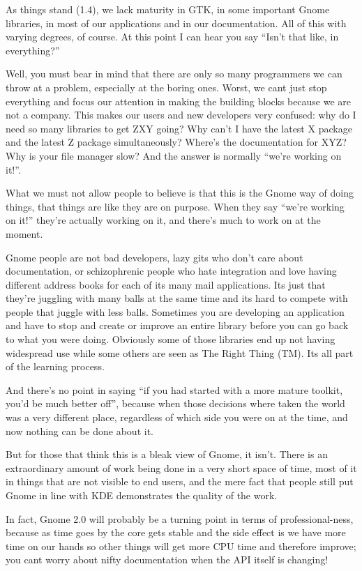 \documentclass{memoir}
\begin{document}
As things stand (1.4), we lack maturity in GTK, in some important
Gnome libraries, in most of our applications and in our
documentation. All of this with varying degrees, of course. At this
point I can hear you say ``Isn't that like, in everything?''

Well, you must bear in mind that there are only so many programmers we
can throw at a problem, especially at the boring ones. Worst, we cant
just stop everything and focus our attention in making the building
blocks because we are not a company. This makes our users and new
developers very confused: why do I need so many libraries to get ZXY
going? Why can't I have the latest X package and the latest Z package
simultaneously? Where's the documentation for XYZ? Why is your file
manager slow? And the answer is normally ``we're working on it!''.

What we must not allow people to believe is that this is the Gnome way
of doing things, that things are like they are on purpose. When they
say ``we're working on it!'' they're actually working on it, and
there's much to work on at the moment.

Gnome people are not bad developers, lazy gits who don't care about
documentation, or schizophrenic people who hate integration and love
having different address books for each of its many mail
applications. Its just that they're juggling with many balls at the
same time and its hard to compete with people that juggle with less
balls. Sometimes you are developing an application and have to stop
and create or improve an entire library before you can go back to what
you were doing. Obviously some of those libraries end up not having
widespread use while some others are seen as The Right Thing (TM). Its
all part of the learning process.

And there's no point in saying ``if you had started with a more mature
toolkit, you'd be much better off'', because when those decisions
where taken the world was a very different place, regardless of which
side you were on at the time, and now nothing can be done about it.

But for those that think this is a bleak view of Gnome, it
isn't. There is an extraordinary amount of work being done in a very
short space of time, most of it in things that are not visible to end
users, and the mere fact that people still put Gnome in line with KDE
demonstrates the quality of the work.

In fact, Gnome 2.0 will probably be a turning point in terms of
professional-ness, because as time goes by the core gets stable and
the side effect is we have more time on our hands so other things will
get more CPU time and therefore improve; you cant worry about nifty
documentation when the API itself is changing!
\end{document}
